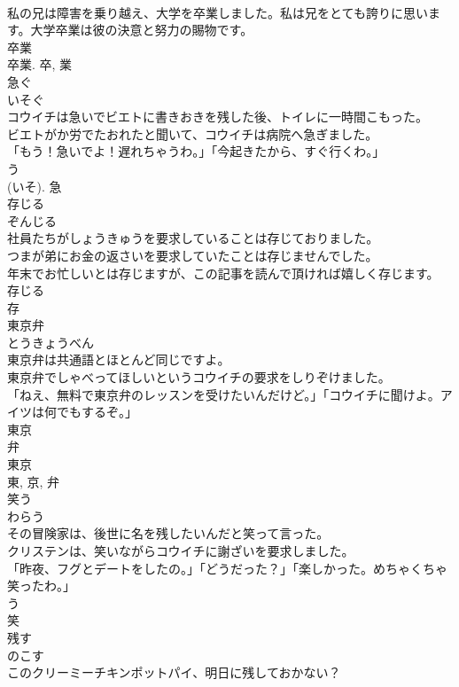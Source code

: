 \documentclass[8pt]{extreport}
\begin{document}
\begin{CJK}{UTF8}{min}
\\	私の兄は障害を乗り越え、大学を卒業しました。私は兄をとても誇りに思います。大学卒業は彼の決意と努力の賜物です。	
\\	卒業 
\\	卒業.	卒, 業	
\\	急ぐ	
\\	いそぐ	
\\	コウイチは急いでビエトに書きおきを残した後、トイレに一時間こもった。	
\\	ビエトがか労でたおれたと聞いて、コウイチは病院へ急ぎました。	
\\	「もう！急いでよ！遅れちゃうわ。」「今起きたから、すぐ行くわ。」	
\\	う 
\\	(いそ).	急	
\\	存じる	
\\	ぞんじる	
\\	社員たちがしょうきゅうを要求していることは存じておりました。	
\\	つまが弟にお金の返さいを要求していたことは存じませんでした。	
\\	年末でお忙しいとは存じますが、この記事を読んで頂ければ嬉しく存じます。	
\\	存じる 
\\	存	
\\	東京弁	
\\	とうきょうべん	
\\	東京弁は共通語とほとんど同じですよ。	
\\	東京弁でしゃべってほしいというコウイチの要求をしりぞけました。	
\\	「ねえ、無料で東京弁のレッスンを受けたいんだけど。」「コウイチに聞けよ。アイツは何でもするぞ。」	
\\	東京 
\\	弁 
\\	東京 
\\	東, 京, 弁	
\\	笑う	
\\	わらう	
\\	その冒険家は、後世に名を残したいんだと笑って言った。	
\\	クリステンは、笑いながらコウイチに謝ざいを要求しました。	
\\	「昨夜、フグとデートをしたの。」「どうだった？」「楽しかった。めちゃくちゃ笑ったわ。」	
\\	う 
\\	笑	
\\	残す	
\\	のこす	
\\	このクリーミーチキンポットパイ、明日に残しておかない？	

\end{CJK}
\end{document}
